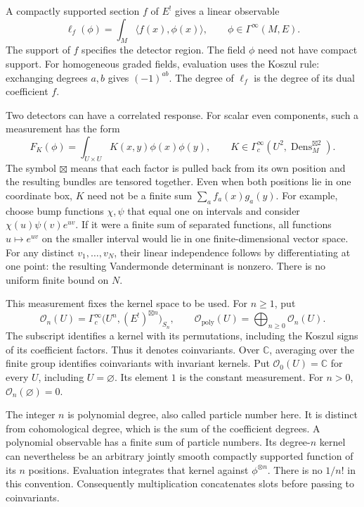 A compactly supported section $f$ of $E^!$ gives a linear observable
\[
 \ell_f(\phi)=\int_M\langle f(x),\phi(x)\rangle,
 \qquad \phi\in\Gamma^\infty(M,E).
\]
The support of $f$ specifies the detector region.
The field $\phi$ need not have compact support.
For homogeneous graded fields, evaluation uses the Koszul rule:
exchanging degrees $a,b$ gives $(-1)^{ab}$.
The degree of $\ell_f$ is the degree of its dual coefficient $f$.

Two detectors can have a correlated response. For scalar even components,
such a measurement has the form
\[
 F_K(\phi)=\int_{U\times U}K(x,y)\phi(x)\phi(y),
 \qquad K\in\Gamma_c^\infty(U^2,\operatorname{Dens}_M^{\boxtimes2}).
\]
The symbol $\boxtimes$ means that each factor is pulled back from its
own position and the resulting bundles are tensored together.
Even when both positions lie in one coordinate box, $K$ need not be a
finite sum $\sum_a f_a(x)g_a(y)$.
For example, choose bump functions $\chi,\psi$ that equal one on
intervals and consider $\chi(u)\psi(v)e^{uv}$.
If it were a finite sum of separated functions, all functions
$u\mapsto e^{uv}$ on the smaller interval would lie in one
finite-dimensional vector space. For any distinct $v_1,\ldots,v_N$,
their linear independence follows by differentiating at one point:
the resulting Vandermonde determinant is nonzero.
There is no uniform finite bound on $N$.

This measurement fixes the kernel space to be used. For $n\geq1$, put
\begin{equation}\label{eq:clo-kernel-space}
 \mathscr O_n(U)=
 \Gamma_c^\infty\bigl(U^n,(E^!)^{\boxtimes n}\bigr)_{S_n},
 \qquad
 \mathscr O_{\mathrm{poly}}(U)=\bigoplus_{n\geq0}\mathscr O_n(U).
\end{equation}
The subscript identifies a kernel with its permutations, including the
Koszul signs of its coefficient factors. Thus it denotes coinvariants.
Over $\mathbb C$, averaging over the finite group identifies coinvariants
with invariant kernels. Put $\mathscr O_0(U)=\mathbb C$ for every $U$,
including $U=\varnothing$. Its element $1$ is the constant measurement.
For $n>0$, $\mathscr O_n(\varnothing)=0$.

The integer $n$ is polynomial degree, also called particle number here.
It is distinct from cohomological degree, which is the sum of the
coefficient degrees. A polynomial observable has a finite sum of
particle numbers. Its degree-$n$ kernel can nevertheless be an arbitrary
jointly smooth compactly supported function of its $n$ positions.
Evaluation integrates that kernel against $\phi^{\otimes n}$.
There is no $1/n!$ in this convention.
Consequently multiplication concatenates slots before passing to
coinvariants.

